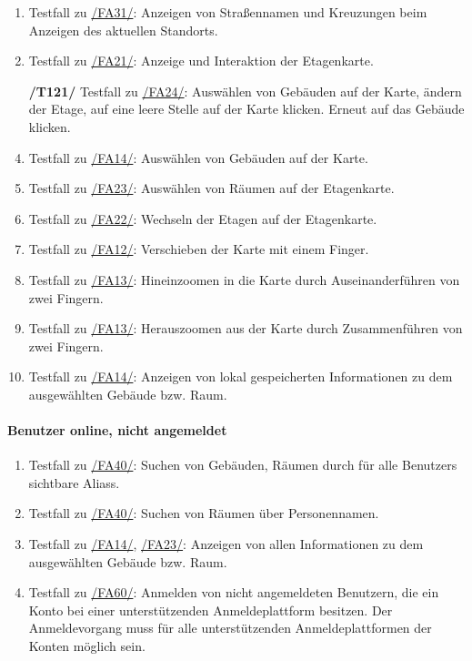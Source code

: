 \begin{enumerate}[label=\textbf{/T\arabic*0/}, align=left]
	\item \label{/T110/} Testfall zu \hyperref[/FA31/]{/FA31/}: Anzeigen von Straßennamen und Kreuzungen beim Anzeigen des aktuellen Standorts.
	\item \label{/T120/} Testfall zu \hyperref[/FA21/]{/FA21/}: Anzeige und Interaktion der \Gls{Etagenkarte}.
	\item[\textbf{/T121/}] \label{/T121/} Testfall zu \hyperref[/FA24/]{/FA24/}: Auswählen von Gebäuden auf der \Gls{Karte}, ändern der Etage, auf eine leere Stelle auf der \Gls{Karte} klicken. Erneut auf das Gebäude klicken.
	\item \label{/T130/} Testfall zu \hyperref[/FA14/]{/FA14/}: Auswählen von Gebäuden auf der \Gls{Karte}.
	\item \label{/T140/} Testfall zu \hyperref[/FA23/]{/FA23/}: Auswählen von Räumen auf der \Gls{Etagenkarte}.
	\item \label{/T150/} Testfall zu \hyperref[/FA22/]{/FA22/}: Wechseln der Etagen auf der \Gls{Etagenkarte}.
	\item \label{/T160/} Testfall zu \hyperref[/FA12/]{/FA12/}: Verschieben der \Gls{Karte} mit einem Finger.
	\item \label{/T170/} Testfall zu \hyperref[/FA13/]{/FA13/}: Hineinzoomen in die \Gls{Karte} durch Auseinanderführen von zwei Fingern.
	\item \label{/T180/} Testfall zu \hyperref[/FA13/]{/FA13/}: Herauszoomen aus der \Gls{Karte} durch Zusammenführen von zwei Fingern.
	\item \label{/T190/} Testfall zu \hyperref[/FA14/]{/FA14/}: Anzeigen von \gls{lokal} gespeicherten Informationen zu dem ausgewählten Gebäude bzw. Raum.
\end{enumerate}

\paragraph{\Gls{Benutzer} online, nicht angemeldet}
\begin{enumerate}[label=\textbf{/T\arabic*0/}, align=left, resume]
	\item \label{/T200/} Testfall zu \hyperref[/FA40/]{/FA40/}: Suchen von Gebäuden, Räumen durch für alle \Glspl{Benutzer} sichtbare \Glspl{Alias}.
	\item \label{/T210/} Testfall zu \hyperref[/FA40/]{/FA40/}: Suchen von Räumen über Personennamen.
	\item \label{/T220/} Testfall zu \hyperref[/FA14/]{/FA14/}, \hyperref[/FA23/]{/FA23/}: Anzeigen von allen Informationen zu dem ausgewählten Gebäude bzw. Raum.
	\item \label{/T230/} Testfall zu \hyperref[/FA60/]{/FA60/}: Anmelden von nicht angemeldeten Benutzern, die ein Konto bei einer unterstützenden Anmeldeplattform besitzen. Der Anmeldevorgang muss für alle unterstützenden Anmeldeplattformen der Konten möglich sein.
\end{enumerate}


